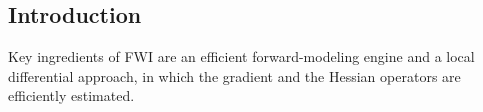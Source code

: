 \renewcommand{\pmk}{Virieux\_2009\_Geophy\_Overview of FWI}
\renewcommand{\prf}{FWI/\pmk.pdf}
\renewcommand{\pti}{An overview of full-waveform inversion
in exploration geophysics}
\renewcommand{\pay}{J. Virieux and S. Operto, 2009}
\renewcommand{\pjo}{Geophysics}
\renewcommand{\pda}{2019/2/8 Fri.}

\section{\pinfo}

\subsection{Introduction}
Key ingredients of FWI are an efficient forward-modeling engine
and a local differential approach,
in which the gradient and the Hessian operators are efficiently estimated.

